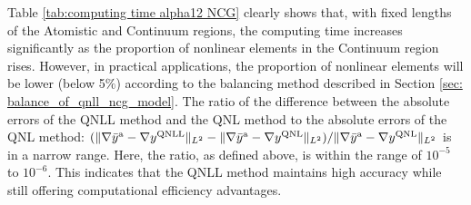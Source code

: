 Table \ref{tab:computing time alpha12 NCG} clearly shows that, with fixed lengths of the Atomistic and Continuum regions, the computing time increases significantly as the proportion of nonlinear elements in the Continuum region rises. However, in practical applications, the proportion of nonlinear elements will be lower (below 5$\%$) according to the balancing method described in Section \ref{sec: balance_of_qnll_ncg_model}. The ratio of the difference between the absolute errors of the QNLL method and the QNL method to the absolute errors of the QNL method: $( \Vert \nabla \bar{y}^{{\rm a}} - \nabla y^{\text{QNLL}} \Vert_{L^{2}} - \Vert \nabla \bar{y}^{{\rm a}} - \nabla y^{\text{QNL}} \Vert_{L^{2}}) / \Vert \nabla \bar{y}^{{\rm a}} - \nabla y^{\text{QNL}} \Vert_{L^{2}}$ is in a narrow range. Here, the ratio, as defined above, is within the range of $10^{-5}$ to $10^{-6}$. This indicates that the QNLL method maintains high accuracy while still offering computational efficiency advantages.